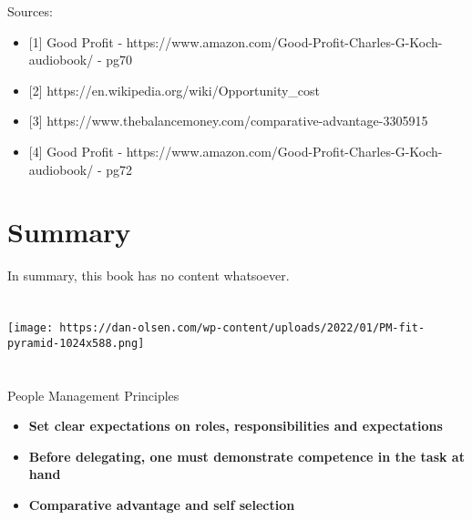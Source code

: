\documentclass[
  letterpaper,
  DIV=11,
  numbers=noendperiod]{scrreprt}
\providecommand{\tightlist}{%
  \setlength{\itemsep}{0pt}\setlength{\parskip}{0pt}}\usepackage{longtable,booktabs,array}
\begin{document}
Sources:

\begin{itemize}
\tightlist
\item
  {[}1{]} Good Profit -
  https://www.amazon.com/Good-Profit-Charles-G-Koch-audiobook/ - pg70
\item
  {[}2{]} https://en.wikipedia.org/wiki/Opportunity\_cost
\item
  {[}3{]} https://www.thebalancemoney.com/comparative-advantage-3305915
\item
  {[}4{]} Good Profit -
  https://www.amazon.com/Good-Profit-Charles-G-Koch-audiobook/ - pg72
\end{itemize}


\hypertarget{summary}{%
\chapter{Summary}\label{summary}}

In summary, this book has no content whatsoever.


\hypertarget{section}{%
\chapter{}\label{section}}

\texttt{[image: https://dan-olsen.com/wp-content/uploads/2022/01/PM-fit-pyramid-1024x588.png]}


\hypertarget{section-1}{%
\chapter{}\label{section-1}}


\hypertarget{section-2}{%
\chapter{}\label{section-2}}

People Management Principles

\begin{itemize}
\tightlist
\item
  \textbf{Set clear expectations on roles, responsibilities and
  expectations}
\item
  \textbf{Before delegating, one must demonstrate competence in the task
  at hand}
\item
  \textbf{Comparative advantage and self selection}
\end{itemize}
\end{document}
